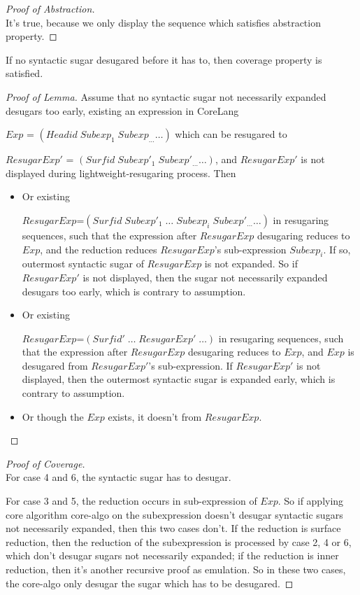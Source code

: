 \begin{proof}[Proof of Abstraction]
\hfill\\
It's true, because we only display the sequence which satisfies abstraction property.
\end{proof}

\begin{lemma}
If no syntactic sugar desugared before it has to, then coverage property is satisfied.
\end{lemma}

\begin{proof}[Proof of Lemma]
Assume that no syntactic sugar not necessarily expanded desugars too early, existing an expression in CoreLang

$Exp$ = $(Headid\;Subexp_{1}\;Subexp_{\ldots} \ldots)$ which can be resugared to

$ResugarExp'$ = $(Surfid\;Subexp'_{1}\;Subexp'_{\ldots}\ldots)$, and $ResugarExp'$ is not displayed during lightweight-resugaring process. Then

\begin{itemize}
	\item Or existing
	
	$ResugarExp$=$(Surfid\;Subexp'_{1}\;\ldots\;Subexp_{i}\;Subexp'_{\ldots}\ldots)$ in resugaring sequences, such that the expression after $ResugarExp$ desugaring reduces to $Exp$, and the reduction reduces $ResugarExp$'s sub-expression $Subexp_{i}$. If so, outermost syntactic sugar of $ResugarExp$ is not expanded. So if $ResugarExp'$ is not displayed, then the sugar not necessarily expanded desugars too early, which is contrary to assumption.
	
	
	\item Or existing
	
	$ResugarExp$=$(Surfid'\;\ldots\;ResugarExp'\;\ldots)$ in resugaring sequences, such that the expression after $ResugarExp$ desugaring reduces to $Exp$, and $Exp$ is desugared from $ResugarExp'$'s sub-expression. If $ResugarExp'$ is not displayed, then the outermost syntactic sugar is expanded early, which is contrary to assumption.
	
	\item Or though the $Exp$ exists, it doesn't from $ResugarExp$.

\end{itemize}
\end{proof}

\begin{proof}[Proof of Coverage]
\hfill\\
For case 4 and 6, the syntactic sugar has to desugar.

For case 3 and 5, the reduction occurs in sub-expression of $Exp$. So if applying core algorithm core-algo on the subexpression doesn't desugar syntactic sugars not necessarily expanded, then this two cases don't. If the reduction is surface reduction, then the reduction of the subexpression is processed by case 2, 4 or 6, which don't desugar sugars not necessarily expanded; if the reduction is inner reduction, then it's another recursive proof as emulation. So in these two cases, the core-algo only desugar the sugar which has to be desugared.


\end{proof}

